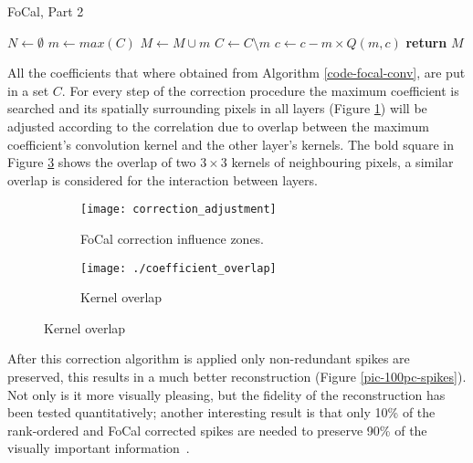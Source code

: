\begin{algorithm}[htb]
  \caption{FoCal, Part 2}
  \label{code-focal-corr}
  \begin{algorithmic}
    \State $N \leftarrow \emptyset$ 
    \Repeat
    \State $m \leftarrow max(C)$
    \State $M \leftarrow M \cup m$
    \State $C \leftarrow C \setminus m$
     
     
    \State $c \leftarrow c - m \times Q(m, c)$
    \EndIf
    \EndFor
    \State \textbf{return} $M$
    \EndProcedure
  \end{algorithmic}
\end{algorithm}

All the coefficients that where obtained from Algorithm \ref{code-focal-conv}, are put in a set $C$. For every step of the correction procedure the maximum coefficient is searched and its spatially surrounding pixels in all layers (Figure \ref{fig:focal2}) will be adjusted according to the correlation due to overlap between the maximum coefficient's convolution kernel and the other layer's kernels. The bold square in Figure \ref{fig:overlap} shows the overlap of two $3\times3$ kernels of neighbouring pixels, a similar overlap is considered for the interaction between layers.
\begin{figure}[htb]
  \centering
  \begin{subfigure}[t]{0.68\textwidth}
  \texttt{[image: correction\_adjustment]}
  \caption{FoCal correction influence zones.}
  \label{fig:focal2}
  \end{subfigure}
  \hfill
  \begin{subfigure}[t]{0.29\textwidth}
  \texttt{[image: ./coefficient\_overlap]}
  \caption{Kernel overlap}
  \label{fig:overlap}
  \end{subfigure}
\end{figure}

After this correction algorithm is applied only non-redundant spikes are preserved, this results in a much better reconstruction (Figure \ref{pic-100pc-spikes}). Not only is it more visually pleasing, but the fidelity of the reconstruction has been tested quantitatively; another interesting result is that only 10\% of the rank-ordered and FoCal corrected spikes are needed to preserve 90\% of the visually important information~\cite{basab-thesis}.

